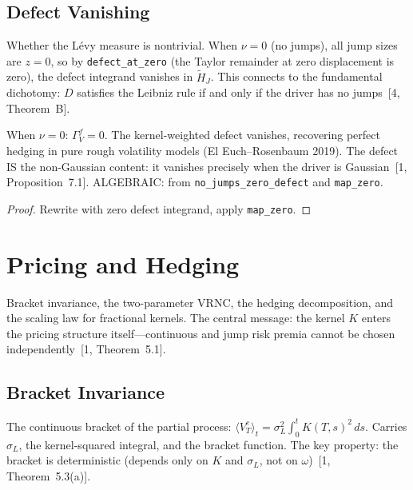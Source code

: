 \section{Defect Vanishing}

\begin{defn}\label{def:JumpPresence}
\leanok
{}
Whether the L\'evy measure is nontrivial. When $\nu = 0$ (no jumps), all jump sizes are $z = 0$, so by \texttt{defect\_at\_zero} (the Taylor remainder at zero displacement is zero), the defect integrand vanishes in $\tilde{H}_J$. This connects to the fundamental dichotomy: $D$ satisfies the Leibniz rule if and only if the driver has no jumps~[4, Theorem~B].
\end{defn}

\begin{theorem}\label{thm:defect_vanishes_without_jumps}
\leanok
{}
When $\nu = 0$: $\Gamma_V^f = 0$. The kernel-weighted defect vanishes, recovering perfect hedging in pure rough volatility models (El Euch--Rosenbaum 2019). The defect IS the non-Gaussian content: it vanishes precisely when the driver is Gaussian~[1, Proposition~7.1]. ALGEBRAIC: from \texttt{no\_jumps\_zero\_defect} and \texttt{map\_zero}.
\end{theorem}
\begin{proof}\leanok Rewrite with zero defect integrand, apply \texttt{map\_zero}.\end{proof}


\chapter{Pricing and Hedging}

Bracket invariance, the two-parameter VRNC, the hedging decomposition, and the scaling law for fractional kernels. The central message: the kernel $K$ enters the pricing structure itself---continuous and jump risk premia cannot be chosen independently~[1, Theorem~5.1].

\section{Bracket Invariance}

\begin{defn}\label{def:BracketData}
\leanok
{}
The continuous bracket of the partial process: $\langle V_T^c \rangle_t = \sigma_L^2 \int_0^t K(T,s)^2\,ds$. Carries $\sigma_L$, the kernel-squared integral, and the bracket function. The key property: the bracket is deterministic (depends only on $K$ and $\sigma_L$, not on $\omega$)~[1, Theorem~5.3(a)].
\end{defn}

